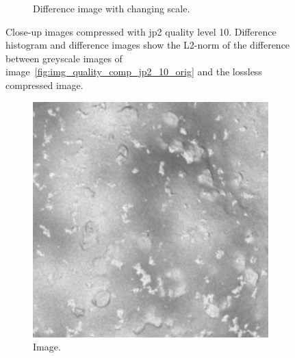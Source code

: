 \begin{figure}[htb]
\begin{subfigure}[b]{0.48\textwidth}
        \caption{Difference image with changing scale.}
        \label{fig:img_quality_comp_jp2_10_center_diff_rel}
    \end{subfigure}
    \caption{Close-up images compressed with \gls{jp2} quality level 10. Difference histogram and difference images show the L2-norm of the difference between greyscale images of image~\ref{fig:img_quality_comp_jp2_10_orig} and the lossless compressed image.}
    \label{fig:img_quality_comp_jp2_10_center}
\end{figure}

\begin{figure}[htb]
    \centering
    \begin{subfigure}[b]{0.48\textwidth}
        \centering
        \includegraphics[width=\textwidth]{doc/thesis/0_figures/compare_quality/set1/jp2_100_center.png}
        \caption{Image.}
        \label{fig:img_quality_comp_jp2_100_center_orig}
    \end{subfigure}
    \begin{subfigure}[b]{0.48\textwidth}
        \centering

\end{subfigure}
\end{figure}
